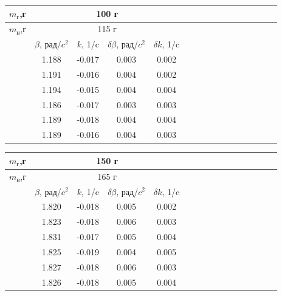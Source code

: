 \documentclass[14pt]{article}
\begin{document}
\begin{center}
\begin{tabular}{|c|c|c|c|c|c|c|c|c|c|c|c|c|c|c|c|}
\hline
$m_\text{г}$,г	&\multicolumn{4}{|c|}{100 г}		\\
\hline
$m_\text{н}$,г	&\multicolumn{4}{|c|}{115 г}		\\
\hline
				&	$\beta$, рад/$c^2$		&	$k$, 1/c		&	$\delta\beta$, рад/$c^2$		&	$\delta k$, 1/c			\\
\hline
				&	1.188					&	-0.017			&	0.003							&	0.002					\\
\hline
				&	1.191					&	-0.016			&	0.004							&	0.002					\\
\hline
				&	1.194					&	-0.015			&	0.004							&	0.004					\\
\hline
				&	1.186					&	-0.017			&	0.003							&	0.003					\\
\hline
				&	1.189					&	-0.018			&	0.004							&	0.004					\\
\hline
				&	1.189					&	-0.016			&	0.004							&	0.003					\\
\hline
\end{tabular}
\end{center}

\begin{center}
\begin{tabular}{|c|c|c|c|c|c|c|c|c|c|c|c|c|c|c|c|}
\hline
$m_\text{г}$,г	&\multicolumn{4}{|c|}{150 г}			\\
\hline
$m_\text{н}$,г	&\multicolumn{4}{|c|}{165 г}		\\
\hline
				&	$\beta$, рад/$c^2$		&	$k$, 1/c		&	$\delta\beta$, рад/$c^2$		&	$\delta k$, 1/c			\\
\hline
				&	1.820					&	-0.018			&	0.005							&	0.002					\\
\hline
				&	1.823					&	-0.018			&	0.006							&	0.003					\\
\hline
				&	1.831					&	-0.017			&	0.005							&	0.004					\\
\hline
				&	1.825					&	-0.019			&	0.004							&	0.005					\\
\hline
				&	1.827					&	-0.018			&	0.006							&	0.003					\\
\hline
				&	1.826					&	-0.018			&	0.005							&	0.004					\\
\hline
\end{tabular}
\end{center}
\end{document}
